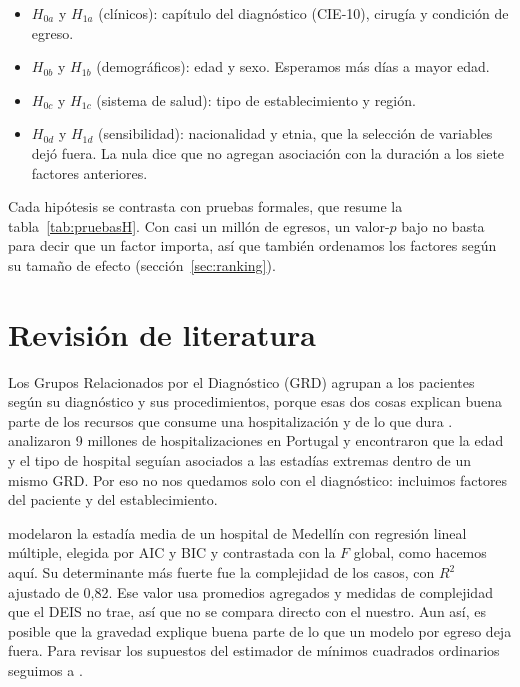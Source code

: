 \documentclass[10.5pt,a4paper,headings=small,abstract=false,bibliography=totoc,listof=totoc]{scrartcl}
\newcommand{\cie}{\mbox{CIE-10}}
\begin{document}
\begin{itemize}\setlength\itemsep{0pt}
\item $H_{0a}$ y $H_{1a}$ (clínicos): capítulo del diagnóstico (\cie), cirugía y condición de egreso.
\item $H_{0b}$ y $H_{1b}$ (demográficos): edad y sexo. Esperamos más días a mayor edad.
\item $H_{0c}$ y $H_{1c}$ (sistema de salud): tipo de establecimiento y región.
\item $H_{0d}$ y $H_{1d}$ (sensibilidad): nacionalidad y etnia, que la selección de variables dejó fuera. La nula dice que no agregan asociación con la duración a los siete factores anteriores.
\end{itemize}

Cada hipótesis se contrasta con pruebas formales, que resume la tabla~\ref{tab:pruebasH}. Con casi un millón de egresos, un valor-$p$ bajo no basta para decir que un factor importa, así que también ordenamos los factores según su tamaño de efecto (sección~\ref{sec:ranking}).

\section{Revisión de literatura}

Los Grupos Relacionados por el Diagnóstico (GRD) agrupan a los pacientes según su diagnóstico y sus procedimientos, porque esas dos cosas explican buena parte de los recursos que consume una hospitalización y de lo que dura \citep{fetter1980}. \citet{freitas2012} analizaron 9 millones de hospitalizaciones en Portugal y encontraron que la edad y el tipo de hospital seguían asociados a las estadías extremas dentro de un mismo GRD. Por eso no nos quedamos solo con el diagnóstico: incluimos factores del paciente y del establecimiento.

\citet{gomez2023} modelaron la estadía media de un hospital de Medellín con regresión lineal múltiple, elegida por AIC y BIC y contrastada con la $F$ global, como hacemos aquí. Su determinante más fuerte fue la complejidad de los casos, con $R^2$ ajustado de 0,82. Ese valor usa promedios agregados y medidas de complejidad que el DEIS no trae, así que no se compara directo con el nuestro. Aun así, es posible que la gravedad explique buena parte de lo que un modelo por egreso deja fuera. Para revisar los supuestos del estimador de mínimos cuadrados ordinarios seguimos a \citet{rodriguez2017}.
\end{document}
